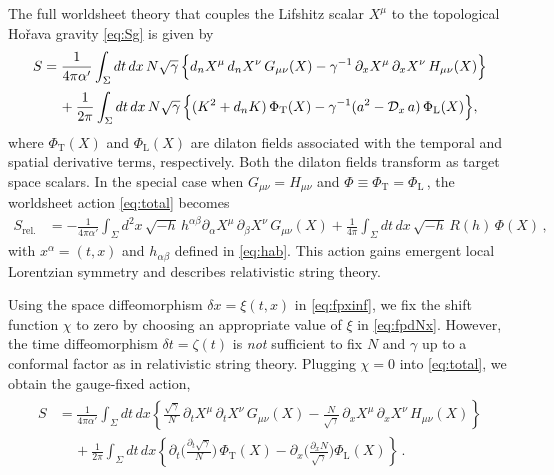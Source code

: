 \documentclass[11pt]{article}
\newcommand{\CD}{\mathcal{D}}
\newcommand{\p}{\partial}
\begin{document}
The full worldsheet theory that couples the Lifshitz scalar $X^\mu$ to the topological Ho\v{r}ava gravity \eqref{eq:Sg} is given by
%
\begin{align} \label{eq:total}
\begin{split}
	S & = \frac{1}{4\pi\alpha'} \int_\Sigma dt \, dx \, N \sqrt{\gamma} \, \Big\{ d_n X^\mu \, d_n X^\nu \, G_{\mu\nu} (X) - \gamma^{-1} \, \p_x X^\mu \, \p_x X^\nu \, H_{\mu\nu} (X) \Bigr\} \\[2pt]
	 & \quad\, + \frac{1}{2\pi} \int_\Sigma dt \, dx \, N \sqrt{\gamma} \, \Bigl\{ (K^2 + d_n K) \, \Phi_\text{T} (X) - \gamma^{-1} (a^2 - \CD_{x} \, a) \, \Phi_\text{L} (X) \Bigr\},
\end{split}
\end{align}
%
where $\Phi_\text{T} (X)$ and $\Phi_\text{L} (X)$ are dilaton fields associated with the temporal and spatial derivative terms, respectively. Both the dilaton fields transform as target space scalars. In the special case when $G_{\mu\nu} = H_{\mu\nu}$ and $\Phi \equiv \Phi_\text{T} = \Phi_\text{L}$\,, the worldsheet action \eqref{eq:total} becomes
%
\begin{align} 
	S_\text{rel.} & = - \frac{1}{4\pi\alpha'} \int_\Sigma d^2x \, \sqrt{-h} \, h^{\alpha\beta} \p_\alpha X^\mu \, \p_\beta X^\nu \, G_{\mu\nu} (X) 
	 + \frac{1}{4\pi} \int_\Sigma dt \, dx \, \sqrt{-h} \, R(h)\, \Phi(X)\,,
\end{align}
%
with $x^\alpha = (t, x)$ and $h_{\alpha\beta}$ defined in \eqref{eq:hab}. This action gains emergent local Lorentzian symmetry and describes relativistic string theory.


Using the space diffeomorphism $\delta x = \xi (t, x)$ in \eqref{eq:fpxinf}, we fix the shift function $\chi$ to zero by choosing an appropriate value of $\xi$ in \eqref{eq:fpdNx}. However, the time diffeomorphism $\delta t = \zeta (t)$ is \emph{not} sufficient to fix $N$ and $
\gamma$ up to a conformal factor as in relativistic string theory. 
%
Plugging $\chi = 0$ into \eqref{eq:total}, we obtain the gauge-fixed action,
%
\begin{align} \label{eq:action}
\begin{split}
	S & = \frac{1}{4\pi \alpha'} \int_\Sigma dt \, dx \left\{ \frac{\sqrt{\gamma}}{N} \, \p_t X^\mu \, \p_t X^\nu \, G_{\mu\nu} (X) - \frac{N}{\sqrt{\gamma}} \, \p_x X^\mu \, \p_x X^\nu \, H_{\mu\nu} (X) \right\} \\[2pt]
	& \quad\, + \frac{1}{2\pi} \int_\Sigma dt \, dx \left\{ \p_t \biggl( \frac{\p_t \sqrt{\gamma}}{N} \biggr)\, \Phi_\text{T} (X) - \p_x \biggl( \frac{ \p_x N }{\sqrt{\gamma}} \biggr) \Phi_\text{L} (X) \right\} \,.
\end{split}
\end{align}
%
\end{document}
